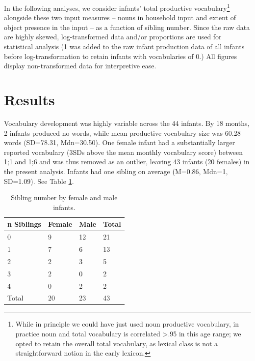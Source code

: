 \documentclass[
  english,
  man,floatsintext]{apa6}
\begin{document}
In the following analyses, we consider infants' total productive vocabulary\footnote{While in principle we could have just used noun productive vocabulary, in practice noun and total vocabulary is correlated \textgreater.95 in this age range; we opted to retain the overall total vocabulary, as lexical class is not a straightforward notion in the early lexicon.
} alongside these two input measures -- nouns in household input and extent of object presence in the input -- as a function of sibling number. Since the raw data are highly skewed, log-transformed data and/or proportions are used for statistical analysis (1 was added to the raw infant production data of all infants before log-transformation to retain infants with vocabularies of 0.) All figures display non-transformed data for interpretive ease.

\hypertarget{results}{%
\section{Results}\label{results}}

Vocabulary development was highly variable across the 44 infants. By 18 months, 2 infants produced no words, while mean productive vocabulary size was 60.28 words (SD=78.31, Mdn=30.50). One female infant had a substantially larger reported vocabulary (3SDs above the mean monthly vocabulary score) between 1;1 and 1;6 and was thus removed as an outlier, leaving 43 infants (20 females) in the present analysis. Infants had one sibling on average (M=0.86, Mdn=1, SD=1.09). See Table \ref{tab:table-sibling-number}.

\begin{table}[tbp]

\begin{center}
\begin{threeparttable}

\caption{\label{tab:table-sibling-number}Sibling number by female and male infants.}

\small{

\begin{tabular}{llll}
\toprule
n Siblings & \multicolumn{1}{c}{Female} & \multicolumn{1}{c}{Male} & \multicolumn{1}{c}{Total}\\
\midrule
0 & 9 & 12 & 21\\
1 & 7 & 6 & 13\\
2 & 2 & 3 & 5\\
3 & 2 & 0 & 2\\
4 & 0 & 2 & 2\\
Total & 20 & 23 & 43\\
\bottomrule
\end{tabular}

}

\end{threeparttable}
\end{center}

\end{table}
\end{document}
